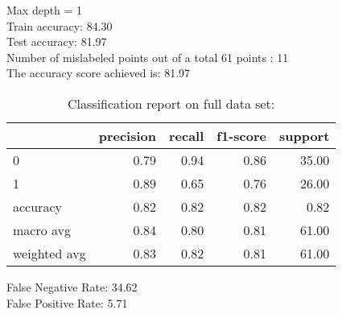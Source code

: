 Max depth = 1\\
Train accuracy: 84.30%
\\Test accuracy: 81.97%
\\Number of mislabeled points out of a total 61 points : 11
\\The accuracy score achieved is: 81.97 %
\begin{table}[H]
\caption{Classification report on full data set:}
\begin{center}
\begin{tabular}{lrrrr}
\toprule
{} &  precision &  recall &  f1-score &  support \\
\midrule
0            &       0.79 &    0.94 &      0.86 &    35.00 \\
1            &       0.89 &    0.65 &      0.76 &    26.00 \\
accuracy     &       0.82 &    0.82 &      0.82 &     0.82 \\
macro avg    &       0.84 &    0.80 &      0.81 &    61.00 \\
weighted avg &       0.83 &    0.82 &      0.81 &    61.00 \\
\bottomrule
\end{tabular}

\label{random_forest_class}
\end{center}
\end{table}
\noindent
False Negative Rate: 34.62
\\False Positive Rate: 5.71
